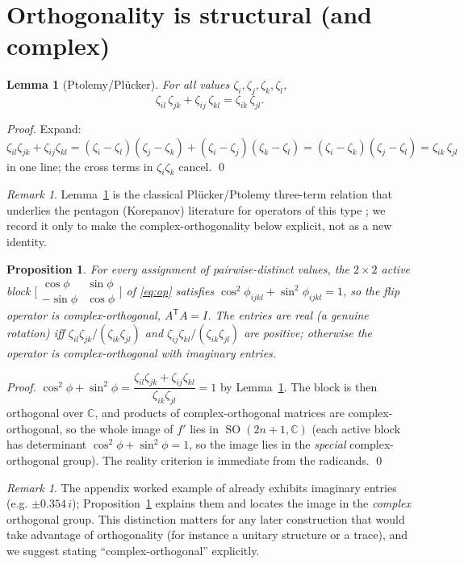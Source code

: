 \documentclass[11pt]{article}
\theoremstyle{plain}
\newtheorem{proposition}[theorem]{Proposition}
\newtheorem{lemma}[theorem]{Lemma}
\theoremstyle{definition}
\theoremstyle{remark}
\newtheorem{remark}[theorem]{Remark}
\newcommand{\zk}[2]{\zeta_{#1#2}}
\newcommand{\C}{\mathbb{C}}
\DeclareMathOperator{\SO}{SO}
\begin{document}
\section{Orthogonality is structural (and complex)}
\begin{lemma}[Ptolemy/Pl\"ucker]\label{lem:ptolemy}
For all values $\zeta_i,\zeta_j,\zeta_k,\zeta_l$,
\[
\zk il\,\zk jk+\zk ij\,\zk kl=\zk ik\,\zk jl .
\]
\end{lemma}
\begin{proof}
Expand: $\zk il\zk jk+\zk ij\zk kl=(\zeta_i-\zeta_l)(\zeta_j-\zeta_k)+(\zeta_i-\zeta_j)(\zeta_k-\zeta_l)
=(\zeta_i-\zeta_k)(\zeta_j-\zeta_l)=\zk ik\,\zk jl$ in one line; the cross terms in $\zeta_i\zeta_k$
cancel. \qed
\end{proof}

\begin{remark}
Lemma~\ref{lem:ptolemy} is the classical Pl\"ucker/Ptolemy three-term relation that underlies the
pentagon (Korepanov) literature for operators of this type \cite{korepanov2013}; we record it only to
make the complex-orthogonality below explicit, not as a new identity.
\end{remark}

\begin{proposition}\label{prop:ortho}
For every assignment of pairwise-distinct values, the $2\times2$ active block
$\bigl[\begin{smallmatrix}\cos\phi&\sin\phi\\-\sin\phi&\cos\phi\end{smallmatrix}\bigr]$ of
\eqref{eq:op} satisfies $\cos^2\phi_{ijkl}+\sin^2\phi_{ijkl}=1$, so the flip operator is
complex-orthogonal, $A^{\mathsf T}A=I$. The entries are real (a genuine rotation) iff
$\zk il\zk jk/(\zk ik\zk jl)$ and $\zk ij\zk kl/(\zk ik\zk jl)$ are positive; otherwise the operator
is complex-orthogonal with imaginary entries.
\end{proposition}
\begin{proof}
$\cos^2\phi+\sin^2\phi=\dfrac{\zk il\zk jk+\zk ij\zk kl}{\zk ik\zk jl}=1$ by
Lemma~\ref{lem:ptolemy}. The block is then orthogonal over $\C$, and products of
complex-orthogonal matrices are complex-orthogonal, so the whole image of $f'$ lies in
$\SO(2n+1,\C)$ (each active block has determinant $\cos^2\phi+\sin^2\phi=1$, so the image lies in the
\emph{special} complex-orthogonal group). The reality criterion is immediate from the radicands. \qed
\end{proof}

\begin{remark}
The appendix worked example of \cite{rohozhkin2026} already exhibits imaginary entries
(e.g. $\pm 0.354\,i$); Proposition~\ref{prop:ortho} explains them and locates the image in the
\emph{complex} orthogonal group. This distinction matters for any later construction that would
take advantage of orthogonality (for instance a unitary structure or a trace), and we suggest
stating ``complex-orthogonal'' explicitly.
\end{remark}
\end{document}
